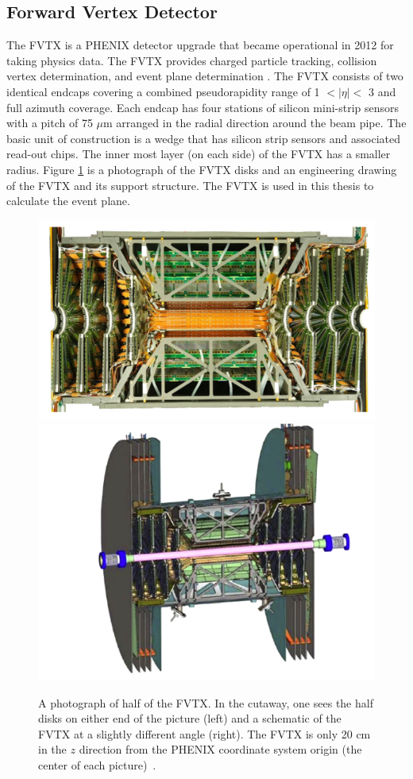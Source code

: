 \subsection{Forward Vertex Detector}
The FVTX is a PHENIX detector upgrade that became operational in 2012 for taking physics data. The FVTX provides charged particle tracking, collision vertex determination, and event plane determination \cite{Aidala201444}. The FVTX consists of two identical endcaps covering a combined pseudorapidity range of 1 $<|\eta|<$ 3 and full azimuth coverage. Each endcap has four stations of silicon mini-strip sensors with a pitch of 75 $\mu$m arranged in the radial direction around the beam pipe. The basic unit of construction is a wedge that has silicon strip sensors and associated read-out chips. The inner most layer (on each side) of the FVTX has a smaller radius. Figure \ref{fig:fvtx_cutaway} is a photograph of the FVTX disks and an engineering drawing of the FVTX and its support structure. The FVTX is used in this thesis to calculate the event plane.
\begin{figure}[h!]
\centering
\includegraphics[width=0.45\linewidth]{figs/fvtx_cutaway.png}
\includegraphics[width=0.45\linewidth]{figs/fvtx_diagram.png}
\caption{A photograph of half of the FVTX. In the cutaway, one sees the half disks on either end of the picture (left) and a schematic of the FVTX at a slightly different angle (right). The FVTX is only 20 cm in the $z$ direction from the PHENIX coordinate system origin (the center of each picture)~\cite{Aidala201444}.}
\label{fig:fvtx_cutaway}
\end{figure}
